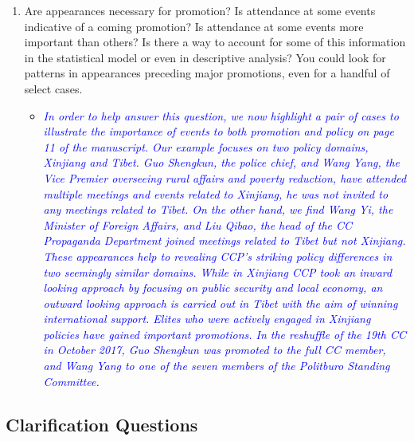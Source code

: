 \begin{enumerate}
\begin{itemize}
{{		}}
	\end{itemize}
	\item Are appearances necessary for promotion? Is attendance at some events indicative of a coming promotion? Is attendance at some events more important than others? Is there a way to account for some of this information in the statistical model or even in descriptive analysis? You could look for patterns in appearances preceding major promotions, even for a handful of select cases.
	\begin{itemize}
		\item \textcolor{blue}{ \emph{
			In order to help answer this question, we now highlight  a pair of cases to illustrate the importance of events to both promotion and policy on page 11 of the manuscript. Our example focuses on two policy domains, Xinjiang and Tibet.  Guo Shengkun, the police chief, and Wang Yang, the Vice Premier overseeing rural affairs and poverty reduction, have attended multiple meetings and events related to Xinjiang, he was not invited to any meetings related to Tibet.   On the other hand, we find Wang Yi, the Minister of Foreign Affairs, and Liu Qibao, the head of the CC Propaganda Department joined meetings related to Tibet but not Xinjiang.  These appearances help to revealing CCP’s striking policy differences in two seemingly similar domains.  While in Xinjiang CCP took an inward looking approach by focusing on public security and local economy, an outward looking approach is carried out in Tibet with the aim of winning international support.  Elites who were actively engaged in Xinjiang policies have gained important promotions.  In the reshuffle of the 19th CC in October 2017, Guo Shengkun was promoted to the full CC member, and Wang Yang to one of the seven members of the Politburo Standing Committee.
		}}
	\end{itemize}
\end{enumerate}

\subsection*{Clarification Questions}


